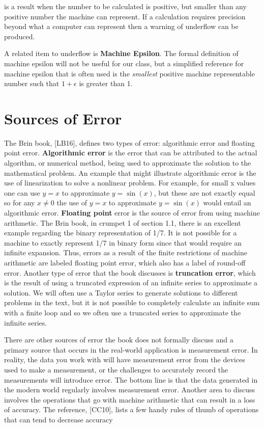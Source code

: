 \documentclass[twoside]{article}
\renewcommand{\cite}[1]{[#1]}
\begin{document}
 is a result when the number to be calculated is positive, but smaller than any positive number the machine can represent.  If a calculation requires precision beyond what a computer can represent then a warning of underflow can be produced. \bigskip \par

A related item to underflow is {\bf Machine Epsilon}. The formal definition of machine epsilon will not be useful for our class, but a simplified reference for machine epsilon that is often used is the {\it smallest} positive machine representable number such that $1+\epsilon$ is greater than 1. 

\section{Sources of Error}
The Brin book, \cite{LB16}, defines two types of error: algorithmic error and floating point error. {\bf Algorithmic error} is the error that can be attributed to the actual algorithm, or numerical method, being used to approximate the solution to the mathematical problem. An example that might illustrate algorithmic error is the use of linearization to solve a nonlinear problem. For example, for small x values one can use $y=x$ to approximate $y = \sin (x)$, but these are not exactly equal so for any $x \neq 0$ the use of $y=x$ to approximate $y = \sin (x)$ would entail an algorithmic error. {\bf Floating point} error is the source of error from using machine arithmetic. The Brin book, in crumpet 1 of section 1.1, there is an excellent example regarding the binary representation of 1/7. It is not possible for a machine to exactly represent 1/7 in binary form since that would require an infinite expansion. Thus, errors as a result of the finite restrictions of machine arithmetic are labeled floating point error, which also has a label of round-off error. Another type of error that the book discusses is {\bf truncation error}, which is the result of using a truncated expression of an infinite series to approximate a solution. We will often use a Taylor series to generate solutions to different problems in the text, but it is not possible to completely calculate an infinite sum with a finite loop and so we often use a truncated series to approximate the infinite series.  \par
There are other sources of error the book does not formally discuss and a primary source that occurs in the real-world application is measurement error. In reality, the data you work with will have measurement error from the devices used to make a measurement, or the challenges to accurately record the measurements will introduce error. The bottom line is that the data generated in the modern world regularly involves measurement error. Another area to discuss involves the operations that go with machine arithmetic that can result in a loss of accuracy.  The reference, \cite{CC10}, lists a few handy rules of thumb of operations that can tend to decrease accuracy
\end{document}
